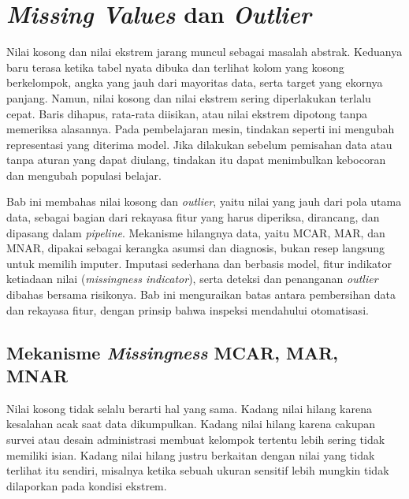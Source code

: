 \chapter{\texorpdfstring{\emph{Missing Values} dan \emph{Outlier}}{Missing Values dan Outlier}}\label{missing-values-dan-outlier}

Nilai kosong dan nilai ekstrem jarang muncul sebagai masalah abstrak. Keduanya baru terasa ketika tabel nyata dibuka dan terlihat kolom yang kosong berkelompok, angka yang jauh dari mayoritas data, serta target yang ekornya panjang. Namun, nilai kosong dan nilai ekstrem sering diperlakukan terlalu cepat. Baris dihapus, rata-rata diisikan, atau nilai ekstrem dipotong tanpa memeriksa alasannya. Pada pembelajaran mesin, tindakan seperti ini mengubah representasi yang diterima model. Jika dilakukan sebelum pemisahan data atau tanpa aturan yang dapat diulang, tindakan itu dapat menimbulkan kebocoran dan mengubah populasi belajar.

Bab ini membahas nilai kosong dan \emph{outlier}, yaitu nilai yang jauh dari pola utama data, sebagai bagian dari rekayasa fitur yang harus diperiksa, dirancang, dan dipasang dalam \emph{pipeline}. Mekanisme hilangnya data, yaitu MCAR, MAR, dan MNAR, dipakai sebagai kerangka asumsi dan diagnosis, bukan resep langsung untuk memilih imputer. Imputasi sederhana dan berbasis model, fitur indikator ketiadaan nilai (\emph{missingness indicator}), serta deteksi dan penanganan \emph{outlier} dibahas bersama risikonya. Bab ini menguraikan batas antara pembersihan data dan rekayasa fitur, dengan prinsip bahwa inspeksi mendahului otomatisasi.

\section{\texorpdfstring{Mekanisme \emph{Missingness} MCAR, MAR, MNAR}{Mekanisme Missingness MCAR, MAR, MNAR}}\label{mekanisme-missingness-mcar-mar-mnar}

Nilai kosong tidak selalu berarti hal yang sama. Kadang nilai hilang karena kesalahan acak saat data dikumpulkan. Kadang nilai hilang karena cakupan survei atau desain administrasi membuat kelompok tertentu lebih sering tidak memiliki isian. Kadang nilai hilang justru berkaitan dengan nilai yang tidak terlihat itu sendiri, misalnya ketika sebuah ukuran sensitif lebih mungkin tidak dilaporkan pada kondisi ekstrem.

